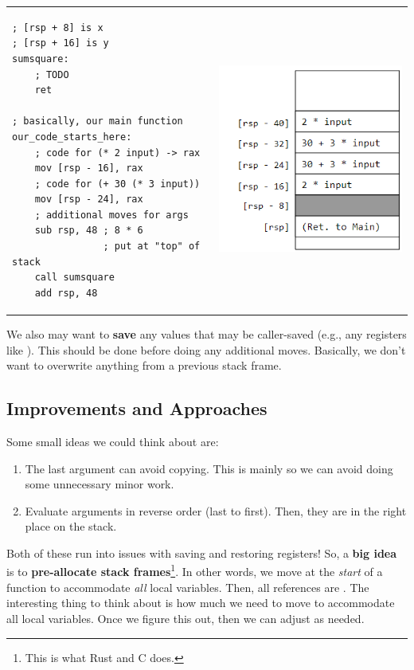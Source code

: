 \begin{center}
    \begin{tabular}{p{3in}|p{3in}}
        \begin{verbatim}
; [rsp + 8] is x 
; [rsp + 16] is y
sumsquare:
    ; TODO 
    ret 

; basically, our main function 
our_code_starts_here:
    ; code for (* 2 input) -> rax 
    mov [rsp - 16], rax 
    ; code for (+ 30 (* 3 input))
    mov [rsp - 24], rax
    ; additional moves for args 
    sub rsp, 48 ; 8 * 6
                ; put at "top" of stack
    call sumsquare
    add rsp, 48\end{verbatim}
        & \begin{center}
            \includegraphics[scale=0.6]{assets/sumsq_arg_order2.png}
        \end{center}
    \end{tabular}
\end{center}
We also may want to \textbf{save} any values that may be caller-saved (e.g., any registers like ). This should be done before doing any additional moves. Basically, we don't want to overwrite anything from a previous stack frame.

\subsection{Improvements and Approaches}
Some small ideas we could think about are: 
\begin{enumerate}
    \item The last argument can avoid copying. This is mainly so we can avoid doing some unnecessary minor work. 
    \item Evaluate arguments in reverse order (last to first). Then, they are in the right place on the stack. 
\end{enumerate}
Both of these run into issues with saving and restoring registers! So, a \textbf{big idea} is to \textbf{pre-allocate stack frames}\footnote{This is what Rust and C does.}. In other words, we move  at the \emph{start} of a function to accommodate \emph{all} local variables. Then, all references are \code{[rsp + \_\_\_]}. The interesting thing to think about is how much we need to move  to accommodate all local variables. Once we figure this out, then we can adjust  as needed. 

